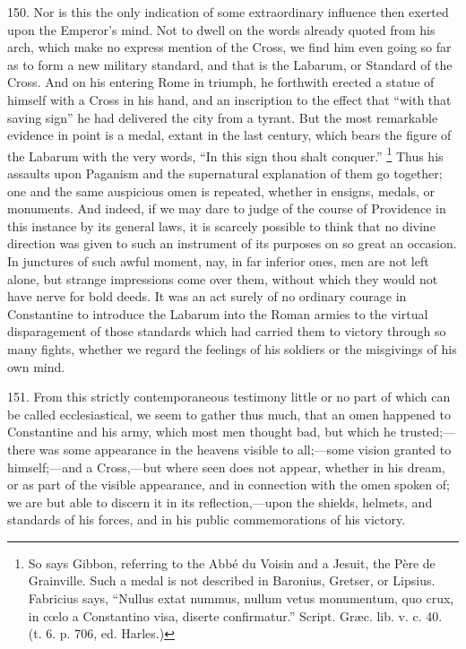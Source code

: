 150.
Nor is this the only indication of some extraordinary influence then
exerted upon the Emperor's mind. Not to dwell on the words already
quoted from his arch, which make no express mention of the Cross, we
find him even going so far as to form a new military standard, and
that is the Labarum, or Standard of the Cross. And on his entering
Rome in triumph, he forthwith erected a statue of himself with a Cross
in his hand, and an inscription to the effect that ``with that saving
sign'' he had delivered the city from a tyrant. But the most remarkable
evidence in point is a medal, extant in the last century, which bears
the figure of the Labarum with the very words, ``In this sign thou
shalt conquer.'' \footnote{So says Gibbon, referring to the Abbé du Voisin and a Jesuit, the Père
de Grainville. Such a medal is not described in Baronius, Gretser, or
Lipsius. Fabricius says, ``Nullus extat nummus, nullum vetus
monumentum, quo crux, in cœlo a Constantino visa, diserte confirmatur.''
Script. Græc. lib. v. c. 40. (t. 6. p. 706, ed. Harles.)} Thus
his assaults upon Paganism and the supernatural explanation of them go
together; one and the same auspicious omen is repeated, whether in
ensigns, medals, or monuments. And indeed, if we may dare to judge of
the course of Providence in this instance by its general laws,
it is scarcely possible to think that no divine direction was given to
such an instrument of its purposes on so great an occasion. In
junctures of such awful moment, nay, in far inferior ones, men are not
left alone, but strange impressions come over them, without which they
would not have nerve for bold deeds. It was an act surely of no
ordinary courage in Constantine to introduce the Labarum into the
Roman armies to the virtual disparagement of those standards which had
carried them to victory through so many fights, whether we regard the
feelings of his soldiers or the misgivings of his own mind.

151.
From this strictly contemporaneous testimony little or no part of
which can be called ecclesiastical, we seem to gather thus much, that
an omen happened to Constantine and his army, which most men thought
bad, but which he trusted;—there was some appearance in the heavens
visible to all;—some vision granted to himself;—and a Cross,—but
where seen does not appear, whether in his dream, or as part of the
visible appearance, and in connection with the omen spoken of; we are
but able to discern it in its reflection,—upon the shields, helmets,
and standards of his forces, and in his public commemorations of his
victory.

